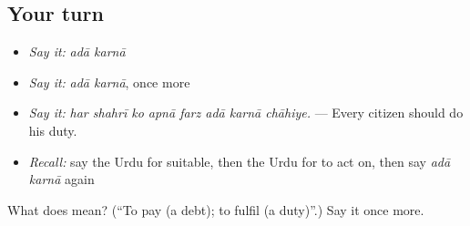 \subsection*{Your turn}
\begin{itemize}
\raggedright
  \item \emph{Say it:} \emph{adā karnā}
  \item \emph{Say it:} \emph{adā karnā}, once more
  \item \emph{Say it:} \emph{har shahrī ko apnā farz adā karnā chāhiye.} — Every citizen should do his duty.
  \item \emph{Recall:} say the Urdu for suitable, then the Urdu for to act on, then say \emph{adā karnā} again
\end{itemize}

\begin{tcolorbox}[breakable,colback=teal!4,colframe=teal!35!black,title={Before you move on}]
What does   mean? (\textquotedblleft{}To pay (a debt); to fulfil (a duty)\textquotedblright{}.) Say it once more.
\end{tcolorbox}
